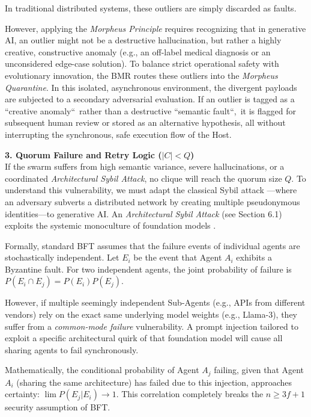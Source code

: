 \documentclass[a4paper,11pt,twocolumn]{article}
\theoremstyle{definition}
\theoremstyle{plain}
\begin{document}
In traditional distributed systems, these outliers are simply discarded as faults.

\pagebreak

However, applying the \textit{Morpheus Principle} requires recognizing that in generative AI, an outlier might not be a destructive hallucination, but rather a highly creative, constructive anomaly (e.g., an off-label medical diagnosis or an unconsidered edge-case solution).
To balance strict operational safety with evolutionary innovation, the BMR routes these outliers into the \textit{Morpheus Quarantine}. In this isolated, asynchronous environment, the divergent payloads are subjected to a secondary adversarial evaluation.
If an outlier is tagged as a “creative anomaly“\ rather than a destructive “semantic fault“,\ it is flagged for subsequent human review or stored as an alternative hypothesis, all without interrupting the synchronous, safe execution flow of the Host.

\textbf{3. Quorum Failure and Retry Logic ($|C| < Q$)} \\
If the swarm suffers from high semantic variance, severe hallucinations, or a coordinated \textit{Architectural Sybil Attack}, no clique will reach the quorum size $Q$. 
To understand this vulnerability, we must adapt the classical Sybil attack \cite{douceur2002sybil}---where an adversary subverts a distributed network by creating multiple pseudonymous identities---to generative AI. An \textit{Architectural Sybil Attack} (see Section 6.1) exploits the systemic monoculture of foundation models \cite{bommasani2021opportunities}. 

Formally, standard BFT assumes that the failure events of individual agents are stochastically independent. Let $E_i$ be the event that Agent $A_i$ exhibits a Byzantine fault. For two independent agents, the joint probability of failure is $P(E_i \cap E_j) = P(E_i)P(E_j)$.

However, if multiple seemingly independent Sub-Agents (e.g., APIs from different vendors) rely on the exact same underlying model weights (e.g., Llama-3), they suffer from a \textit{common-mode failure} vulnerability. A prompt injection tailored to exploit a specific architectural quirk of that foundation model will cause all sharing agents to fail synchronously. 

Mathematically, the conditional probability of Agent $A_j$ failing, given that Agent $A_i$ (sharing the same architecture) has failed due to this injection, approaches certainty: $\lim P(E_j | E_i) \to 1$. This correlation completely breaks the $n \ge 3f + 1$ security assumption of BFT.
\end{document}
